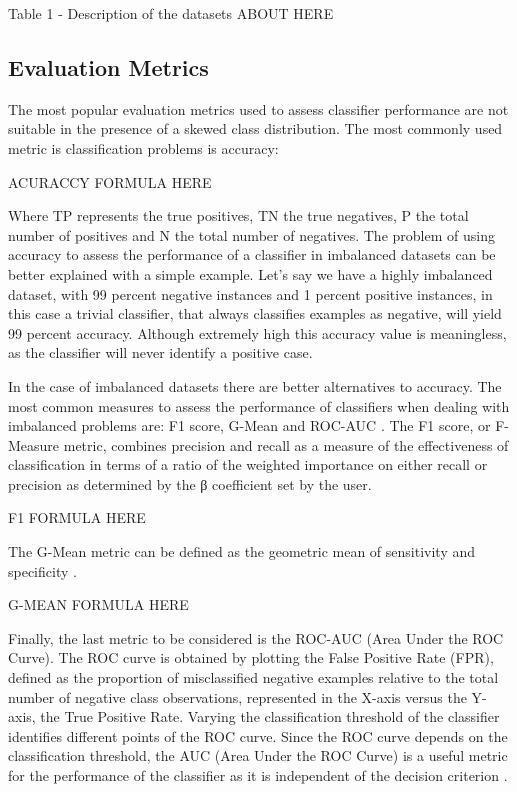 \documentclass[parskip=full]{scrartcl}
\begin{document}
Table 1 - Description of the datasets ABOUT HERE

\subsection{Evaluation Metrics}

The most popular evaluation metrics used to assess classifier performance are 
not suitable in the presence of a skewed class distribution. The most commonly 
used metric is classification problems is accuracy:

ACURACCY FORMULA HERE

Where TP represents the true positives, TN the true negatives, P the total 
number of positives and N the total number of negatives. The problem of using 
accuracy to assess the performance of a classifier in imbalanced datasets can 
be better explained with a simple example. Let’s say we have a highly 
imbalanced dataset, with 99 percent negative instances and 1 percent positive 
instances, in this case a trivial classifier, that always classifies examples 
as negative, will yield 99 percent accuracy. Although extremely high this 
accuracy value is meaningless, as the classifier will never identify a positive 
case.

In the case of imbalanced datasets there are better alternatives to accuracy. 
The most common measures to assess the performance of classifiers when dealing 
with imbalanced problems are: F1 score, G-Mean and ROC-AUC \cite{He2009}. The 
F1 score, or F-Measure metric, combines precision and recall as a measure of 
the effectiveness of classification in terms of a ratio of the weighted 
importance on either recall or precision as determined by the β coefficient set 
by the user.

F1 FORMULA HERE

The G-Mean metric can be defined as the geometric mean of sensitivity and 
specificity \cite{He2009}.

G-MEAN FORMULA HERE

Finally, the last metric to be considered is the ROC-AUC (Area Under the ROC 
Curve). The ROC curve is obtained by plotting the False Positive Rate (FPR), 
defined as the proportion of misclassified negative examples relative to the 
total number of negative class observations, represented in the X-axis versus 
the Y-axis, the True Positive Rate. Varying the classification threshold of the 
classifier identifies different points of the ROC curve. Since the ROC curve 
depends on the classification threshold, the AUC (Area Under the ROC Curve) is 
a useful metric for the performance of the classifier as it is independent of 
the decision criterion \cite{He2009}.
\end{document}
